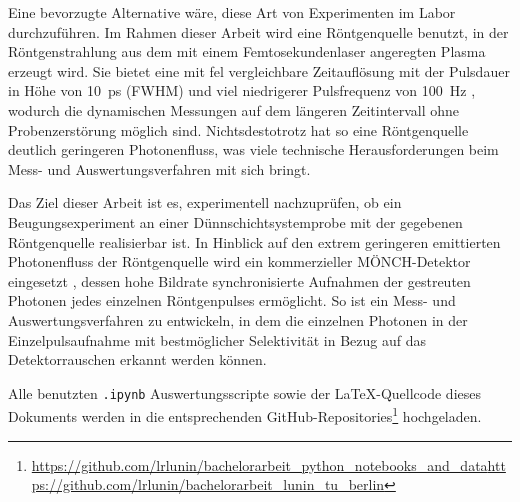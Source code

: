 \noindent
Eine bevorzugte Alternative wäre, diese Art von Experimenten im Labor durchzuführen. Im Rahmen dieser Arbeit wird eine Röntgenquelle benutzt, in der Röntgenstrahlung aus dem mit einem Femtosekundenlaser angeregten Plasma erzeugt wird. Sie bietet eine mit \gls{fel} vergleichbare Zeitauflösung mit der Pulsdauer in Höhe von \SI{10}{\pico\second} (FWHM) und viel niedrigerer Pulsfrequenz von \SI{100}{\hertz} \cite{schick_laser-driven_2021}, wodurch die dynamischen Messungen auf dem längeren Zeitintervall ohne Probenzerstörung möglich sind. Nichtsdestotrotz hat so eine Röntgenquelle deutlich geringeren Photonenfluss, was viele technische Herausforderungen beim Mess- und Auswertungsverfahren mit sich bringt.

\noindent
Das Ziel dieser Arbeit ist es, experimentell nachzuprüfen, ob ein Beugungsexperiment an einer Dünnschichtsystemprobe mit der gegebenen Röntgenquelle realisierbar ist. In Hinblick auf den extrem geringeren emittierten Photonenfluss der Röntgenquelle wird ein kommerzieller MÖNCH-Detektor eingesetzt \cite{ramilli-measurements-2017}, dessen hohe Bildrate synchronisierte Aufnahmen der gestreuten Photonen jedes einzelnen Röntgenpulses ermöglicht. So ist ein Mess- und Auswertungsverfahren zu entwickeln, in dem die einzelnen Photonen in der Einzelpulsaufnahme mit bestmöglicher Selektivität in Bezug auf das Detektorrauschen erkannt werden können.

\noindent
Alle benutzten \texttt{.ipynb} Auswertungsscripte sowie der \LaTeX-Quellcode dieses Dokuments werden in die entsprechenden GitHub-Repositories\footnote{\url{https://github.com/lrlunin/bachelorarbeit_python_notebooks_and_data}\newline\url{https://github.com/lrlunin/bachelorarbeit_lunin_tu_berlin}} hochgeladen.   
